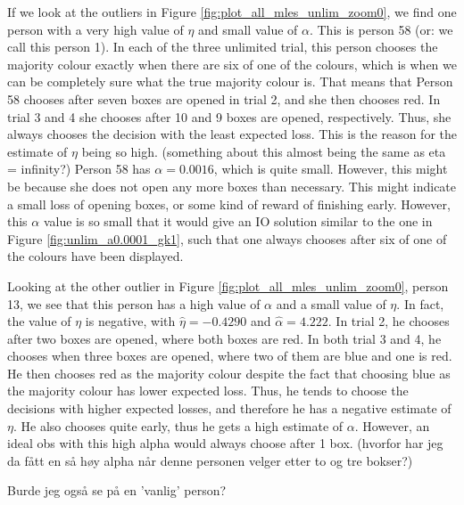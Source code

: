  
If we look at the outliers in Figure \ref{fig:plot_all_mles_unlim_zoom0}, we find one person with a very high value of $\eta$ and small value of $\alpha$. This is person 58 (or: we call this person 1). In each of the three unlimited trial, this person chooses the majority colour exactly when there are six of one of the colours, which is when we can be completely sure what the true majority colour is. That means that Person 58 chooses after seven boxes are opened in trial 2, and she then chooses red. In trial 3 and 4 she chooses after 10 and 9 boxes are opened, respectively. Thus, she always chooses the decision with the least expected loss. This is the reason for the estimate of $\eta$ being so high. (something about this almost being the same as eta = infinity?) Person 58 has $\alpha=0.0016$, which is quite small. However, this might be because she does not open any more boxes than necessary. This might indicate a small loss of opening boxes, or some kind of reward of finishing early. However, this $\alpha$ value is so small that it would give an IO solution similar to the one in Figure \ref{fig:unlim_a0.0001_gk1}, such that one always chooses after six of one of the colours have been displayed. 

Looking at the other outlier in Figure \ref{fig:plot_all_mles_unlim_zoom0}, person 13, we see that this person has a high value of $\alpha$ and a small value of $\eta$. In fact, the value of $\eta$ is negative,  with $\hat{\eta}=-0.4290$ and $\hat{\alpha}=4.222$. In trial 2, he chooses after two boxes are opened, where both boxes are red. In both trial 3 and 4, he chooses when three boxes are opened, where two of them are blue and one is red. He then chooses red as the majority colour despite the fact that choosing blue as the majority colour has lower expected loss. Thus, he tends to choose the decisions with higher expected losses, and therefore he has a negative estimate of $\eta$. He also chooses quite early, thus he gets a high estimate of $\alpha$. However, an ideal obs with this high alpha would always choose after 1 box. (hvorfor har jeg da fått en så høy alpha når denne personen velger etter to og tre bokser?)


Burde jeg også se på en 'vanlig' person?



